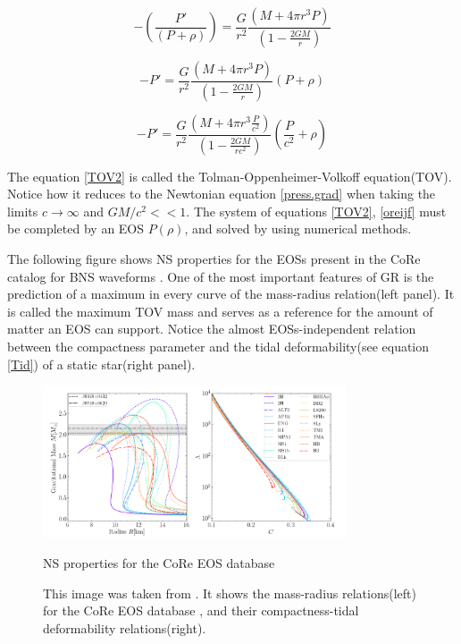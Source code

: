 \begin{equation}
- \left( \frac{P'}{(P+\rho)}\right) = \frac{G}{r^2} \frac{\left( M + 4\pi r^3 P \right)}{\left(  1 - \frac{2GM}{r} \right)}
\end{equation}

\begin{equation}
- P' = \frac{G}{r^2} \frac{\left( M + 4\pi r^3 P \right)}{\left(  1 - \frac{2GM}{r} \right)} (P+\rho)
\end{equation}

\begin{equation}\label{TOV2}
- P' = \frac{G}{r^2} \frac{\left( M + 4\pi r^3 \frac{P}{c^2} \right)}{\left(  1 - \frac{2GM}{r c^2} \right)} \left( \frac{P}{c^2}+\rho \right)
\end{equation}

The equation \ref{TOV2} is called the Tolman-Oppenheimer-Volkoff equation(TOV). Notice how it reduces to the Newtonian equation \ref{press.grad} when taking the limits $c\rightarrow \infty$ and $GM/c^2 <<1$. The system of equations \ref{TOV2}, \ref{oreijf} must be completed by an EOS $P(\rho)$, and solved by using numerical methods.

The following figure shows NS properties for the EOSs present in the CoRe catalog for BNS waveforms \cite{Dietrich:2018phi}. One of the most important features of GR is the prediction of a maximum in every curve of the mass-radius relation(left panel). It is called the maximum TOV mass and serves as a reference for the amount of matter an EOS can support. Notice the almost EOSs-independent relation between the compactness parameter and the tidal deformability(see equation \ref{Tid}) of a static star(right panel). 

\begin{figure}[hbt!]
\begin{center}
\includegraphics[width=0.8\textwidth, angle=0]{images/EOS_TOV.png}
\captionsetup{width=.8\textwidth}
\caption{NS properties for the CoRe EOS database}
\caption*{This image was taken from \cite{EOSDB}. It shows the mass-radius relations(left) for the CoRe EOS database \cite{Dietrich:2018phi}, and their compactness-tidal deformability relations(right).}
\label{equations of state and tidal deformability}
\end{center}
\end{figure}

